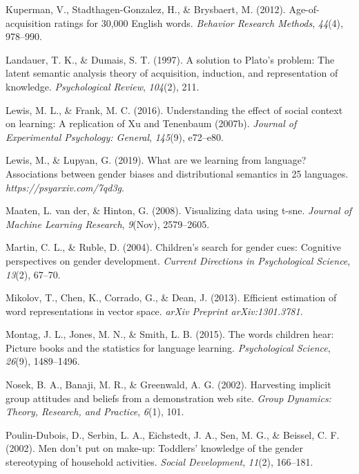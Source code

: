 \documentclass[
  english,
  ,man,floatsintext]{apa6}
\begin{document}
\leavevmode\hypertarget{ref-kuperman2012age}{}%
Kuperman, V., Stadthagen-Gonzalez, H., \& Brysbaert, M. (2012). Age-of-acquisition ratings for 30,000 English words. \emph{Behavior Research Methods}, \emph{44}(4), 978--990.

\leavevmode\hypertarget{ref-landauer1997solution}{}%
Landauer, T. K., \& Dumais, S. T. (1997). A solution to Plato's problem: The latent semantic analysis theory of acquisition, induction, and representation of knowledge. \emph{Psychological Review}, \emph{104}(2), 211.

\leavevmode\hypertarget{ref-lewis2016understanding}{}%
Lewis, M. L., \& Frank, M. C. (2016). Understanding the effect of social context on learning: A replication of Xu and Tenenbaum (2007b). \emph{Journal of Experimental Psychology: General}, \emph{145}(9), e72--e80.

\leavevmode\hypertarget{ref-lewis2019we}{}%
Lewis, M., \& Lupyan, G. (2019). What are we learning from language? Associations between gender biases and distributional semantics in 25 languages. \emph{https://psyarxiv.com/7qd3g}.

\leavevmode\hypertarget{ref-maaten2008visualizing}{}%
Maaten, L. van der, \& Hinton, G. (2008). Visualizing data using t-sne. \emph{Journal of Machine Learning Research}, \emph{9}(Nov), 2579--2605.

\leavevmode\hypertarget{ref-martin2004children}{}%
Martin, C. L., \& Ruble, D. (2004). Children's search for gender cues: Cognitive perspectives on gender development. \emph{Current Directions in Psychological Science}, \emph{13}(2), 67--70.

\leavevmode\hypertarget{ref-mikolov2013efficient}{}%
Mikolov, T., Chen, K., Corrado, G., \& Dean, J. (2013). Efficient estimation of word representations in vector space. \emph{arXiv Preprint arXiv:1301.3781}.

\leavevmode\hypertarget{ref-montag2015words}{}%
Montag, J. L., Jones, M. N., \& Smith, L. B. (2015). The words children hear: Picture books and the statistics for language learning. \emph{Psychological Science}, \emph{26}(9), 1489--1496.

\leavevmode\hypertarget{ref-nosek2002harvesting}{}%
Nosek, B. A., Banaji, M. R., \& Greenwald, A. G. (2002). Harvesting implicit group attitudes and beliefs from a demonstration web site. \emph{Group Dynamics: Theory, Research, and Practice}, \emph{6}(1), 101.

\leavevmode\hypertarget{ref-poulin2002men}{}%
Poulin-Dubois, D., Serbin, L. A., Eichstedt, J. A., Sen, M. G., \& Beissel, C. F. (2002). Men don't put on make-up: Toddlers' knowledge of the gender stereotyping of household activities. \emph{Social Development}, \emph{11}(2), 166--181.
\end{document}
